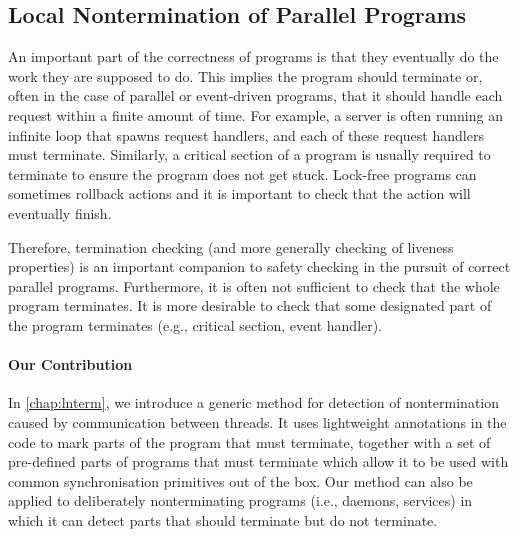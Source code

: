 \subsection{Local Nontermination of Parallel Programs}

An important part of the correctness of programs is that they eventually do the work they are supposed to do.
This implies the program should terminate or, often in the case of parallel or event-driven programs, that it should handle each request within a finite amount of time.
For example, a server is often running an infinite loop that spawns request handlers, and each of these request handlers must terminate.
Similarly, a critical section of a program is usually required to terminate to ensure the program does not get stuck.
Lock-free programs can sometimes rollback actions and it is important to check that the action will eventually finish.

Therefore, termination checking (and more generally checking of liveness properties) is an important companion to safety checking in the pursuit of correct parallel programs.
Furthermore, it is often not sufficient to check that the whole program terminates.
It is more desirable to check that some designated part of the program terminates (e.g., critical section, event handler).

\paragraph{Our Contribution}
In \autoref{chap:lnterm}, we introduce a generic method for
detection of nontermination caused by communication between threads.
It uses lightweight annotations in the code to mark parts of the program that
must terminate, together with a set of pre-defined parts of programs that must
terminate which allow it to be used with common synchronisation primitives out
of the box.
Our method can also be applied to deliberately nonterminating programs (i.e.,
daemons, services) in which it can detect parts that should terminate but do
not terminate.

